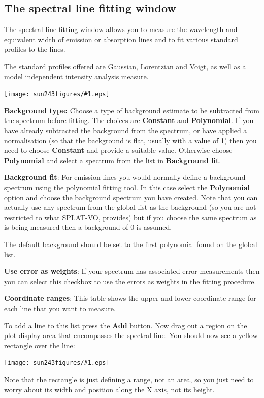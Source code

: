 \documentclass[twoside,11pt]{article}
\newcommand{\htmladdimg}[1]{}
\newcommand{\latexhtml}[2]{#1}
\renewcommand{\_}{\texttt{\symbol{95}}}
\newcommand{\SPLAT}{\textsf{SPLAT-VO}}
\newcommand{\mainfigure}[1]
{\begin{center}
 \latexhtml{\texttt{[image: sun243\_figures/\#1.eps]}}{\htmladdimg{#1.gif}}
 \end{center}
}
\newcommand{\labelitem}[1]{\textbf{#1}}
\begin{document}
\newpage
\subsection{The spectral line fitting window}

The spectral line fitting window allows you to measure the wavelength
and equivalent width of emission or absorption lines and to fit
various standard profiles to the lines.

The standard profiles offered are Gaussian, Lorentzian and Voigt, as
well as a model independent intensity analysis measure.

\mainfigure{linefitwindow}

\labelitem{Background type:} Choose a type of background estimate to
be subtracted from the spectrum before fitting. The choices are
\labelitem{Constant} and \labelitem{Polynomial}. If you have already
subtracted the background from the spectrum, or have applied a
normalisation (so that the background is flat, usually with a value of
1) then you need to choose \labelitem{Constant} and provide a suitable
value. Otherwise choose \labelitem{Polynomial} and select a spectrum
from the list in \labelitem{Background fit}.

\labelitem{Background fit}: For emission lines you would normally
define a background spectrum using the polynomial fitting tool. In
this case select the \labelitem{Polynomial} option and choose the
background spectrum you have created. Note that you can actually use
any spectrum from the global list as the background (so you are not
restricted to what \SPLAT, provides) but if you choose the same
spectrum as is being measured then a background of $0$ is assumed.

The default background should be set to the first polynomial found on
the global list.

\labelitem{Use error as weights}: If your spectrum has associated
error measurements then you can select this checkbox to use the errors
as weights in the fitting procedure.

\labelitem{Coordinate ranges}: This table shows the upper and lower
coordinate range for each line that you want to measure.

To add a line to this list press the \labelitem{Add} button. Now drag
out a region on the plot display area that encompasses the spectral
line. You should now see a yellow rectangle over the line:

\mainfigure{linefitplotwindow}

Note that the rectangle is just defining a range, not an area, so you
just need to worry about its width and position along the X axis, not
its height.
\end{document}
